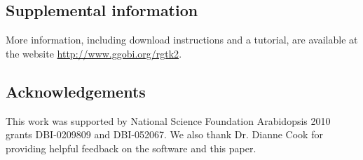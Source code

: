 \documentclass[article]{jss}
\begin{document}
\subsection*{Supplemental information}

More information, including download instructions and a tutorial,
are available at the  website \url{http://www.ggobi.org/rgtk2}.


\subsection*{Acknowledgements}

This work was supported by National Science Foundation Arabidopsis
2010 grants DBI-0209809 and DBI-052067. We also thank Dr. Dianne Cook
for providing helpful feedback on the software and this paper.

%

\end{document}
